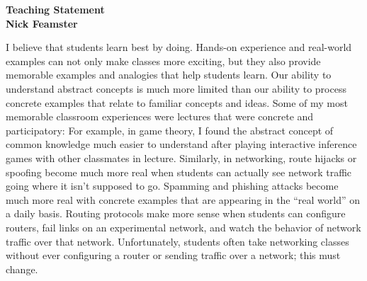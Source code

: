 \newpage \setcounter{page}{1}

\begin{center}
{\Large\textbf{Teaching Statement}}\\[0.1in] {\large\textbf{Nick
Feamster}}\\
\end{center}

I believe that students learn best by doing.  Hands-on experience and
real-world examples can not only make classes more exciting, but they
also provide memorable examples and analogies that help students learn.
Our ability to understand abstract concepts is much more limited than
our ability to process concrete examples that relate to familiar
concepts and ideas.  Some of my most memorable classroom experiences
were lectures that were concrete and participatory: For example, in game
theory, I found the abstract concept of common knowledge much easier to
understand after playing interactive inference games with other
classmates in lecture.  Similarly, in networking, route hijacks or
spoofing become much more real when students can actually see network
traffic going where it isn't supposed to go.  Spamming and phishing
attacks become much more real with concrete examples that are appearing
in the ``real world'' on a daily basis.  Routing protocols make more
sense when students can configure routers, fail links on an experimental
network, and watch the behavior of network traffic over that network.
Unfortunately, students often take networking classes without ever
configuring a router or sending traffic over a network; this must
change.


